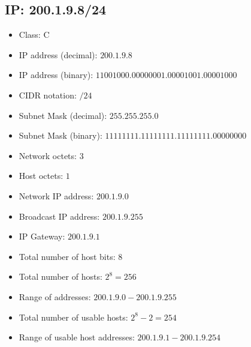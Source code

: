 \documentclass{article}
\begin{document}
\subsection*{IP: 200.1.9.8/24}
  \begin{itemize}
    \item Class: C
    \item IP address (decimal): $200.1.9.8$
    \item IP address (binary): $11001000.00000001.00001001.00001000$
    \item CIDR notation: $/24$
    \item Subnet Mask (decimal): $255.255.255.0$ 
    \item Subnet Mask (binary): $11111111.11111111.11111111.00000000$
    \item Network octets: $3$
    \item Host octets: $1$
    \item Network IP address: $200.1.9.0$
    \item Broadcast IP address: $200.1.9.255$
    \item IP Gateway: $200.1.9.1$
    \item Total number of host bits: $8$
    \item Total number of hosts: $2^{8} = 256$
    \item Range of addresses: $200.1.9.0 - 200.1.9.255$
    \item Total number of usable hosts: $2^{8} - 2 = 254$
    \item Range of usable host addresses: $200.1.9.1 - 200.1.9.254$
  \end{itemize}
\end{document}

